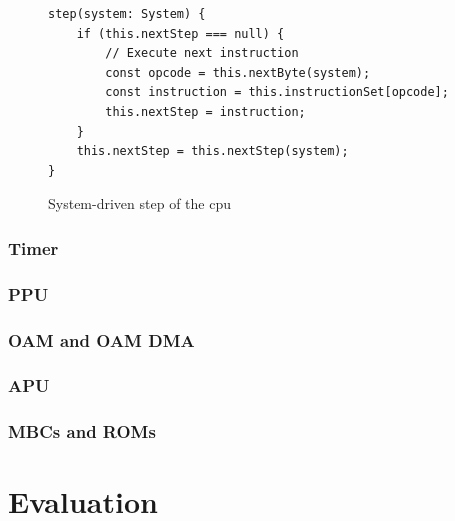 \documentclass[11pt]{report}
\begin{document}
\begin{figure}[h]
    \begin{verbatim}
step(system: System) {
    if (this.nextStep === null) {
        // Execute next instruction
        const opcode = this.nextByte(system);
        const instruction = this.instructionSet[opcode];
        this.nextStep = instruction;
    }
    this.nextStep = this.nextStep(system);
}
    \end{verbatim}
    \caption{System-driven step of the \gls{cpu}}
    \label{fig:system-driven-cpu-tick}
\end{figure}

\subsection{Timer}
\subsection{PPU}
\subsection{OAM and OAM DMA}
\subsection{APU}
\subsection{MBCs and ROMs}

\chapter{Evaluation}


\clearpage

\printnoidxglossary[type=\acronymtype]
\printnoidxglossary[type=main]

\printbibliography
\end{document}
